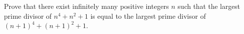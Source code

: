 Prove that there exist infinitely many positive integers 
$n$
 such that the largest prime divisor of 
$n^4 + n^2 + 1$
 is equal to the largest prime divisor of 
$(n+1)^4 + (n+1)^2 +1$.
